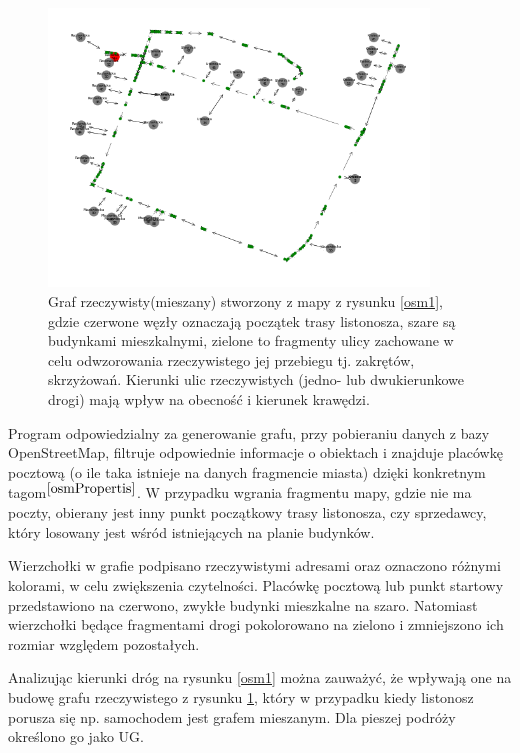 \documentclass[a4paper, 12pt, twoside, openright]{article}
\begin{document}
\captionsetup{justification=centering}
\begin{figure}[htb]
	\centering
	\includegraphics[width=0.9\textwidth]{img/grafRzecz/osm1Graf}
	\caption[]{Graf rzeczywisty(mieszany) stworzony z mapy z rysunku \ref{osm1}, gdzie czerwone węzły oznaczają początek trasy listonosza, szare są budynkami mieszkalnymi, zielone to fragmenty ulicy zachowane w celu odwzorowania rzeczywistego jej przebiegu tj. zakrętów, skrzyżowań. Kierunki ulic rzeczywistych (jedno- lub dwukierunkowe drogi) mają wpływ na obecność i kierunek krawędzi.}
	\label{osm1G}
\end{figure}

Program odpowiedzialny za generowanie grafu, przy pobieraniu danych z bazy OpenStreetMap, filtruje odpowiednie informacje o obiektach i znajduje placówkę pocztową (o ile taka istnieje na danych fragmencie miasta) dzięki konkretnym tagom$^{\cite{osmPropertis}}$. W przypadku wgrania fragmentu mapy, gdzie nie ma poczty, obierany jest inny punkt początkowy trasy listonosza, czy sprzedawcy, który losowany jest wśród istniejących na planie budynków.

Wierzchołki w grafie podpisano rzeczywistymi adresami oraz oznaczono różnymi kolorami, w celu zwiększenia czytelności. Placówkę pocztową lub punkt startowy przedstawiono na czerwono, zwykłe budynki mieszkalne na szaro. Natomiast wierzchołki będące fragmentami drogi pokolorowano na zielono i zmniejszono ich rozmiar względem pozostałych.

Analizując kierunki dróg na rysunku \ref{osm1} można zauważyć, że wpływają one na budowę grafu rzeczywistego z rysunku \ref{osm1G}, który w przypadku kiedy listonosz porusza się np. samochodem jest grafem mieszanym. Dla pieszej podróży  określono go jako UG.
\end{document}
